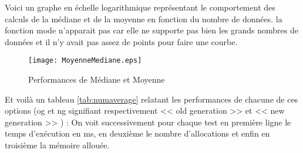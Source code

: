 Voici un graphe en \'echelle logarithmique repr\'esentant le comportement des calculs de la m\'ediane et de la moyenne en fonction du nombre de 
donn\'ees. la fonction mode n'apparait pas car elle ne supporte pas bien les grands nombres de donn\'ees et il n'y avait pas assez de points pour 
faire une courbe.

\begin{figure}[h]
\begin{center}
\texttt{[image: MoyenneMediane.eps]}
\end{center}
\caption{Performances de M\'ediane et Moyenne}
\end{figure}

Et voil\`a un tableau \ref{tab:numaverage} relatant les performances de chacune de ces options (og et ng signifiant respectivement << old generation >> et << new generation >> ) : 
\newline
On voit successivement pour chaque test en premi\`ere ligne le temps d'ex\'ecution en ms, en deuxi\`eme le nombre d'allocations et enfin en troisi\`eme 
la m\'emoire allou\'ee.
\newline

